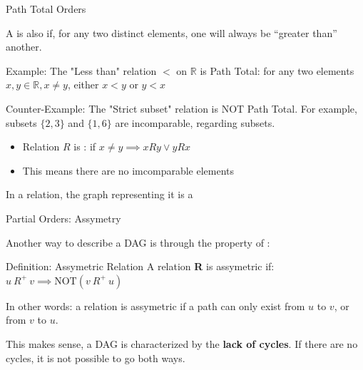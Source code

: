 \begin{frame}[t]{Path Total Orders}

  A  is also  if, for any two distinct elements, one will always be ``greater than'' another.
  \bigskip

  Example: The "Less than" relation $<$ on $\mathbb{R}$ is Path Total: for any two elements $x,y \in \mathbb{R}, x \neq y$, either $x < y$ or $y < x$
  \bigskip

  Counter-Example: The "Strict subset" relation is NOT Path Total. For example, subsets $\{2, 3\}$ and $\{1, 6\}$ are incomparable, regarding subsets.\bigskip

  \begin{block}{}
  \begin{itemize}
  \item Relation $R$ is : if $x \neq y \implies xRy \lor yRx$
  \item This means there are \alert{no imcomparable elements}
  \end{itemize}
  \end{block}

  In a  relation, the graph representing it is a 
\begin{center}
\end{center}
\end{frame}

\begin{frame}[t]{Partial Orders: Assymetry}
  
  Another way to describe a DAG is through the property of :\bigskip

  \begin{block}{Definition: Assymetric Relation}
    A relation {\bf R} is assymetric if: $u~R^+~v \implies \text{NOT}(v~R^+~u)$
  \end{block}\bigskip

  In other words: a relation is assymetric if a path can only exist from $u$ to $v$, or from $v$ to $u$.\bigskip 

  This makes sense, a DAG is characterized by the {\bf lack of cycles}. If there are no cycles, it is not possible to go both ways.
\end{frame}

